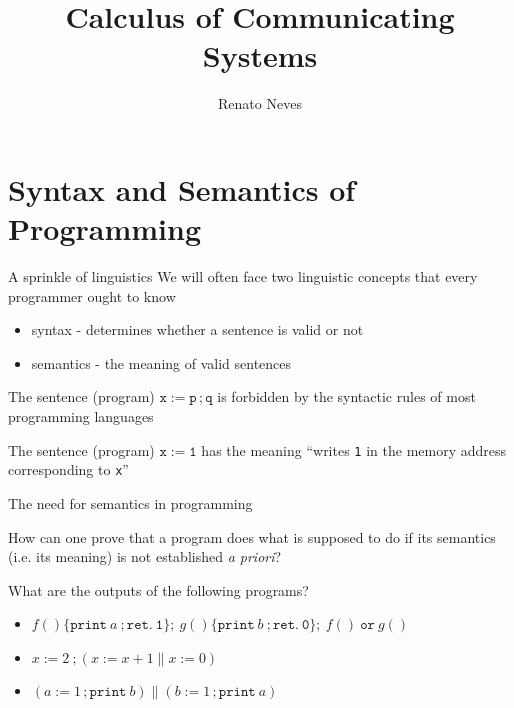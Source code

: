 \documentclass{beamer}
\author[Renato Neves]{Renato Neves}
\date{}
\begin{document}
\title{Calculus of Communicating Systems}

\frame[plain]{\titlepage}

\section{Syntax and Semantics of Programming}

\begin{frame}{A sprinkle of linguistics}
  We will often face two linguistic concepts that every programmer
  ought to know
  \begin{itemize}
  \item syntax - determines whether a sentence
    is valid or not
  \item semantics - the meaning of valid sentences
  \end{itemize}

  \vfill
  \begin{example}[syntax]
      The sentence (program) $\mathtt{x := p\, ;q}$ is forbidden by
      the syntactic rules of most programming languages
    \end{example}
  \begin{example}[semantics]
      The sentence (program) $\mathtt{x := 1}$ has the meaning ``writes
      \texttt{1} in the memory address corresponding to \texttt{x}''
  \end{example}
\end{frame}

\begin{frame}{The need for semantics in programming}

  How can one prove that a program does what is supposed to do if its
  semantics (i.e. its meaning) is not established \emph{a priori}?

  \vfill
  \begin{examples}
    What are the outputs of the following programs?
    \begin{itemize}
            \item $f()\{ \mathtt{print}\ a\ ; \mathtt{ret.\ 1} \} ;\
                g()\{ \mathtt{print}\ b\ ; \mathtt{ret.\ 0} \};\
                f()\ \mathtt{or}\ g()$ 
            \item $x:=2\ ; (x := x + 1 \parallel  x := 0)$ 
            \item $(a:= 1\, ; \mathtt{print}\ b) \parallel 
                    (b:= 1\, ; \mathtt{print}\ a)$ 
    \end{itemize}
  \end{examples}

\end{frame}
\end{document}
